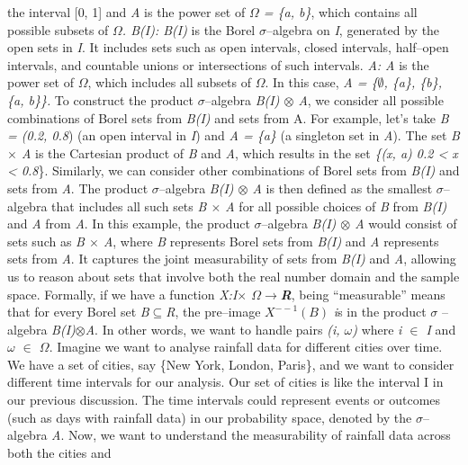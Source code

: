 \documentclass[12pt,a4paper]{report}
\numberwithin{equation}{section}
\begin{document}
the interval {[}0, 1{]} and \emph{A} is the power set of \emph{$\Omega$ = \{a,
b\}}, which contains all possible subsets of \emph{$\Omega$. B(I): B(I)} is the
Borel $\sigma$--algebra on \emph{I}, generated by the open sets in \emph{I}. It
includes sets such as open intervals, closed intervals, half--open
intervals, and countable unions or intersections of such intervals.
\emph{A: A} is the power set of \emph{$\Omega$}, which includes all subsets of
\emph{$\Omega$}. In this case, \emph{A = \{$\emptyset$, \{a\}, \{b\}, \{a, b\}\}.} To
construct the product $\sigma$--algebra \emph{B(I) $\otimes$ A}, we consider all
possible combinations of Borel sets from \emph{B(I)} and sets from A.
For example, let's take \emph{B = (0.2, 0.8}) (an open interval in
\emph{I}) and \emph{A = \{a\}} (a singleton set in \emph{A}). The set
\emph{B $\times$ A} is the Cartesian product of \emph{B} and \emph{A}, which
results in the set \emph{\{(x, a) \textbar{} 0.2 \textless{} x
\textless{} 0.8}\}. Similarly, we can consider other combinations of
Borel sets from \emph{B(I)} and sets from \emph{A}. The product
$\sigma$--algebra \emph{B(I) $\otimes$ A} is then defined as the smallest $\sigma$--algebra that
includes all such sets \emph{B $\times$ A} for all possible choices of \emph{B}
from \emph{B(I)} and \emph{A} from \emph{A}. In this example, the
product $\sigma$--algebra \emph{B(I) $\otimes$ A} would consist of sets such as \emph{B
$\times$ A}, where \emph{B} represents Borel sets from \emph{B(I)} and \emph{A}
represents sets from \emph{A}. It captures the joint measurability of
sets from \emph{B(I)} and \emph{A}, allowing us to reason about sets
that involve both the real number domain and the sample space. Formally,
if we have a function \emph{X:I$\times$ $\Omega$$\rightarrow$\textbf{R}}, being ``measurable''
means that for every Borel set \emph{B$\subseteq$R}, the pre--image \(X^{-- 1}(B)\)
\emph{i}s in the product $\sigma$ --algebra \emph{B(I)$\otimes$A}. In other words, we
want to handle pairs \emph{(i, $\omega$)} where \emph{i $\in$ I} and \emph{$\omega$ $\in$ $\Omega$}.
Imagine we want to analyse rainfall data for different cities over time.
We have a set of cities, say \{New York, London, Paris\}, and we want to
consider different time intervals for our analysis. Our set of cities is
like the interval I in our previous discussion. The time intervals could
represent events or outcomes (such as days with rainfall data) in our
probability space, denoted by the $\sigma$--algebra \emph{A}. Now, we want to
understand the measurability of rainfall data across both the cities and
\end{document}
